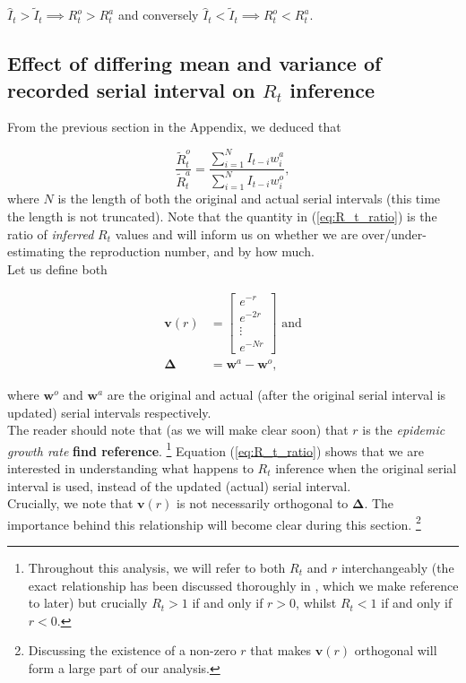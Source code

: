 \documentclass[10pt,journal,compsoc]{IEEEtran}
\begin{document}
$\hat{I}_t> \tilde{I}_t \implies R_t^o>R_t^a$ and conversely $\hat{I}_t< \tilde{I}_t \implies R_t^o<R_t^a$.

\newpage
\subsection{Effect of differing mean and variance of recorded serial interval on $R_t$ inference}

From the previous section in the Appendix, we deduced that

\begin{equation} \label{eq:R_t_ratio}
\frac{\tilde{R}_t^o}{\tilde{R}_t^a} = \frac{\sum_{i=1}^{N}I_{t-i}w_i^a}{\sum_{i=1}^{N}I_{t-i}w_i^o},
\end{equation}
where $N$ is the length of both the original and actual serial intervals (this time the length is not truncated). Note that the quantity in (\ref{eq:R_t_ratio}) is the ratio of \textit{inferred} $R_t$ values and will inform us on whether we are over/under-estimating the reproduction number, and by how much.\\
Let us define both

  \begin{align*}
    \boldsymbol{v}(r) &= \begin{bmatrix}
           e^{-r} \\
           e^{-2r} \\
           \vdots \\
           e^{-Nr}
         \end{bmatrix} \text{ and}\\
         \boldsymbol{\Delta} &= \boldsymbol{w}^a-\boldsymbol{w}^o,
  \end{align*}
  
where $\boldsymbol{w}^o$ and $\boldsymbol{w}^a$ are the original and actual (after the original serial interval is updated) serial intervals respectively.\\
The reader should note that (as we will make clear soon) that $r$ is the \textit{epidemic growth rate} \textbf{find reference}. \footnote{Throughout this analysis, we will refer to both $R_t$ and $r$ interchangeably (the exact relationship has been discussed thoroughly in \cite{Wallinga-Lipsitch}, which we make reference to later) but crucially $R_t>1$ if and only if $r>0$, whilst $R_t<1$ if and only if $r<0$.}
Equation (\ref{eq:R_t_ratio}) shows that we are interested in understanding what happens to $R_t$ inference when the original serial interval is used, instead of the updated (actual) serial interval.\\
Crucially, we note that $\boldsymbol{v}(r)$ is not necessarily orthogonal to $\boldsymbol{\Delta}$. The importance behind this relationship will become clear during this section. \footnote{Discussing the existence of a non-zero $r$ that makes $\boldsymbol{v}(r)$ orthogonal will form a large part of our analysis.}
\end{document}

